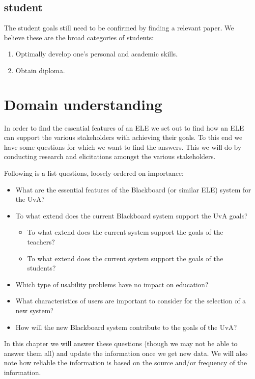 \section{student}
The student goals still need to be confirmed by finding a relevant paper. We believe these are the broad categories of students:
\begin{enumerate}
	\item Optimally develop one's personal and academic skills.	
	\item Obtain diploma.
\end{enumerate}



\chapter{Domain understanding} 
In order to find the essential features of an ELE we set out to find how an ELE can support the various stakeholders with achieving their goals. To this end we have some questions for which we want to find the answers. This we will do by conducting research and elicitations amongst the various stakeholders.

Following is a list questions, loosely ordered on importance:
\begin{itemize}
	\item What are the essential features of the Blackboard (or similar ELE) system for the UvA?

	\item To what extend does the current Blackboard system support the UvA goals?
	\begin{itemize}
		\item To what extend does the current system support the goals of the teachers?
		\item To what extend does the current system support the goals of the students?
	\end{itemize}
	
	\item Which type of usability problems have no impact on education?
	\item What characteristics of users are important to consider for the selection of a new system?
	\item How will the new Blackboard system contribute to the goals of the UvA?
\end{itemize}

In this chapter we will answer these questions (though we may not be able to answer them all) and update the information once we get new data. We will also note how reliable the information is based on the source and/or frequency of the information.


